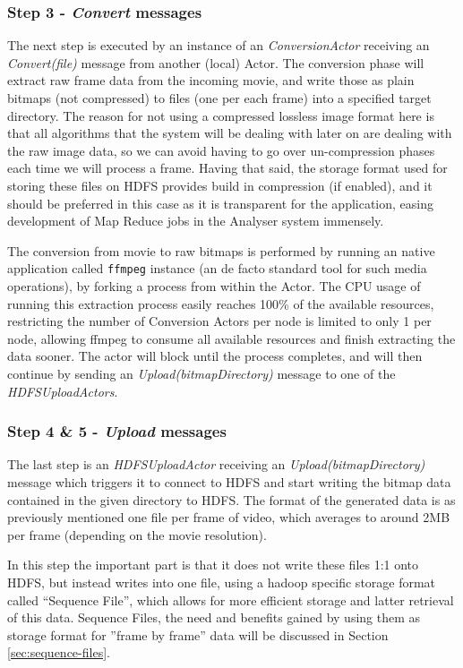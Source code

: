 \subsubsection{Step 3 - \textit{Convert} messages}
The next step is executed by an instance of an \textit{ConversionActor} receiving an \textit{Convert(file)} message from another (local) Actor. The conversion phase will extract raw frame data from the incoming movie, and write those as plain bitmaps (not compressed) to files (one per each frame) into a specified target directory. The reason for not using a compressed lossless image format here is that all algorithms that the system will be dealing with later on are dealing with the raw image data, so we can avoid having to go over un-compression phases each time we will process a frame. Having that said, the storage format used for storing these files on HDFS provides build in compression (if enabled), and it should be preferred in this case as it is transparent for the application, easing development of Map Reduce jobs in the Analyser system immensely.

The conversion from movie to raw bitmaps is performed by running an native application called \verb|ffmpeg| \cite{ffmpeg} instance (an de facto standard tool for such media operations), by forking a process from within the Actor. The CPU usage of running this extraction process easily reaches 100\% of the available resources, restricting the number of Conversion Actors per node is limited to only 1 per node, allowing ffmpeg to consume all available resources and finish extracting the data sooner. The actor will block until the process completes, and will then continue by sending an \textit{Upload(bitmapDirectory)} message to one of the \textit{HDFSUploadActors}.

\subsubsection{Step 4 \& 5 - \textit{Upload} messages}
The last step is an \textit{HDFSUploadActor} receiving an \textit{Upload(bitmapDirectory)} message which triggers it to connect to HDFS and start writing the bitmap data contained in the given directory to HDFS. The format of the generated data is as previously mentioned one file per frame of video, which averages to around 2MB per frame (depending on the movie resolution).

In this step the important part is that it does not write these files 1:1 onto HDFS, but instead writes into one file, using a hadoop specific storage format called ``Sequence File'', which allows for more efficient storage and latter retrieval of this data. Sequence Files, the need and benefits gained by using them as storage format for ''frame by frame'' data will be discussed in Section \ref{sec:sequence-files}.

